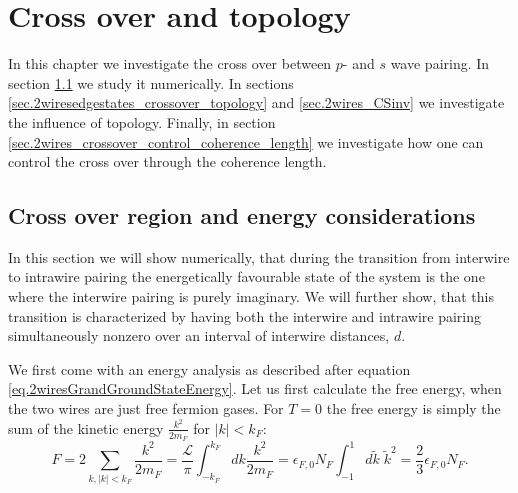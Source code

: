 
\chapter{Cross over and topology} %

\label{Chapter10} %


In this chapter we investigate the cross over between $p$- and $s$ wave pairing. In section \ref{sec.2wiresCrossover_energy} we study it numerically. In sections \ref{sec.2wiresedgestates_crossover_topology} and \ref{sec.2wires_CSinv} we investigate the influence of topology. Finally, in section \ref{sec.2wires_crossover_control_coherence_length} we investigate how one can control the cross over through the coherence length. 

\section{Cross over region and energy considerations}
\label{sec.2wiresCrossover_energy}
In this section we will show numerically, that during the transition from interwire to intrawire pairing the energetically favourable state of the system is the one where the interwire pairing is purely imaginary. We will further show, that this transition is characterized by having both the interwire and intrawire pairing simultaneously nonzero over an interval of interwire distances, $d$. 

We first come with an energy analysis as described after equation \eqref{eq.2wiresGrandGroundStateEnergy}. Let us first calculate the free energy, when the two wires are just free fermion gases. For $T = 0$ the free energy is simply the sum of the kinetic energy $\frac{k^2}{2m_F}$ for $|k| < k_F$: 
\begin{equation}
F = 2\sum_{k, |k| < k_F} \frac{k^2}{2m_F} = \frac{\mathcal{L}}{\pi} \int^{k_F}_{-k_F} dk \frac{k^2}{2m_F} = \epsilon_{F,0} N_F \int^{1}_{-1} d\tilde{k}\; \tilde{k}^2 = \frac{2}{3}\epsilon_{F,0} N_F. 
\end{equation}

